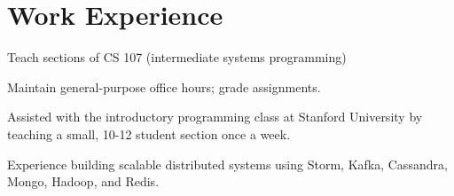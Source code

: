\documentclass[letterpaper]{deedy-resume} %
\begin{document}
%
\begin{minipage}[t]{0.66\textwidth} %


\section{Work Experience}


\vspace{\topsep} %
\begin{tightitemize}
\item Teach sections of CS 107 (intermediate systems programming)
\item Maintain general-purpose office hours; grade assignments.
\end{tightitemize}

\sectionspace %

\begin{tightitemize}
\item Assisted with the introductory programming class at Stanford University by teaching a small, 10-12 student section once a week.
\end{tightitemize}

\sectionspace %



\begin{tightitemize}
\item Experience building scalable distributed systems using Storm, Kafka, Cassandra, Mongo, Hadoop, and Redis.


\end{tightitemize}
\end{minipage}
\end{document}

